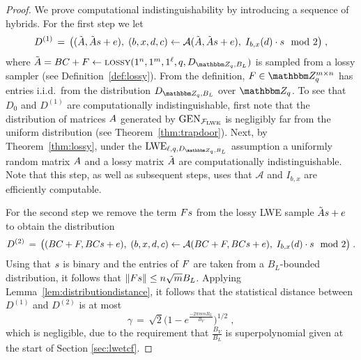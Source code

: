 \begin{proof}
We prove computational indistinguishability by introducing a sequence of hybrids. For the first step we let 
\begin{eqnarray}\label{eq:initialtolossy}
{D}^{(1)} \,=\, \big((\tilde{\*A}, \tilde{\*A}\*s + \*e),\; (b,x,d,c)\leftarrow \mathcal{A}(\tilde{\*A},\tilde{\*A}\*s + \*e),\; I_{b,x}(d)\cdot s \mod 2\big)\;,
\end{eqnarray}
where $\tilde{\*A} = \*B\*C + \*F \leftarrow \lossy(1^n,1^m,1^\ell,q,D_{\mZ_q,B_L})$ is sampled from a lossy sampler (see Definition~\ref{def:lossy}). From the definition, $\*F\in \mZ_q^{m\times n}$ has entries i.i.d.\ from the distribution $D_{\mZ_q,B_L}$ over $\mZ_q$. To see that ${D}_{0}$ and ${D}^{(1)}$ are computationally indistinguishable, first note that the distribution of matrices $\*A$ generated by $\textrm{GEN}_{\mathcal{F}_{\mathrm{LWE}}}$ is negligibly far from the uniform distribution (see Theorem~\ref{thm:trapdoor}). Next, by Theorem~\ref{thm:lossy}, under the $\lwe_{\ell,q,D_{\mZ_q,B_L}}$ assumption a uniformly random matrix $\*A$ and a lossy matrix $\tilde{\*A}$ are computationally indistinguishable. Note that this step, as well as subsequent steps, uses that $\mathcal{A}$ and $I_{b,x}$ are efficiently computable. 

For the second step we remove the term $\*F\*s$ from the lossy LWE sample $\tilde{\*A}\*s + \*e$ to obtain the distribution
\begin{eqnarray}\label{eq:lossystatdistance}
{D}^{(2)} \,=\, \big( (\*B\*C+\*F, \*B\*C\*s + \*e),\; (b,x,d,c)\leftarrow \mathcal{A}(\*B\*C + \*F,\*B\*C\*s + \*e),\; I_{b,x}(d) \cdot s\mod 2\big) \;.
\end{eqnarray}
Using that $\*s$ is binary and the entries of $\*F$ are taken from a $B_L$-bounded distribution, it follows that $\|\*F\*s\|\leq n\sqrt{m}B_L$. Applying Lemma~\ref{lem:distributiondistance}, it follows that the statistical distance between ${D}^{(1)}$ and ${D}^{(2)}$ is at most 
\begin{equation}\label{eq:def-gamma}
\gamma \,=\, \sqrt{2}\Big(1 - e^{\frac{-2\pi mnB_L}{B_V}}\Big)^{1/2}\;,
\end{equation}
which is negligible, due to the requirement that $\frac{B_V}{B_L}$ is superpolynomial given at the start of Section \ref{sec:lwetcf}.


\end{proof}
